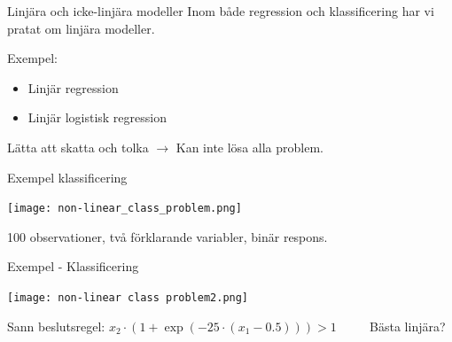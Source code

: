 \documentclass[10pt,english]{beamer}
\begin{document}
\begin{frame}{Linjära och icke-linjära modeller}
    Inom både regression och klassificering har vi pratat om linjära modeller.

    Exempel:
    \begin{itemize}
        \item Linjär regression
        \item Linjär logistisk regression
    \end{itemize}

    Lätta att skatta och tolka $\rightarrow$ Kan inte lösa alla problem.
\end{frame}

\begin{frame}{Exempel klassificering}
   
   \texttt{[image: non-linear\_class\_problem.png]}
   
    100 observationer, två förklarande variabler, binär respons.

   
\end{frame}


\begin{frame}{Exempel - Klassificering}
    
    \texttt{[image: non-linear class problem2.png]}

    Sann beslutsregel: $x_2 \cdot (1 + \exp(-25 \cdot (x_1 - 0.5))) > 1$ $\qquad$ Bästa linjära?

\end{frame}
\end{document}
